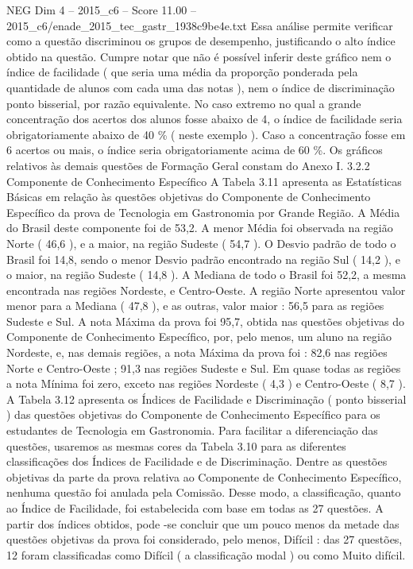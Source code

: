 \begin{textsample}{NEG Dim 4 – 2015\_c6 – Score 11.00 – 2015\_c6/enade\_2015\_tec\_gastr\_1938c9be4e.txt}
Essa análise permite verificar como a questão discriminou os grupos de desempenho, justificando o alto índice obtido na questão.
Cumpre notar que não é possível inferir deste gráfico nem o índice de facilidade ( que seria uma média da proporção ponderada pela quantidade de alunos com cada uma das notas ), nem o índice de discriminação ponto bisserial, por razão equivalente.
No caso extremo no qual a grande concentração dos acertos dos alunos fosse abaixo de 4, o índice de facilidade seria obrigatoriamente abaixo de 40 \% ( neste exemplo ).
Caso a concentração fosse em 6 acertos ou mais, o índice seria obrigatoriamente acima de 60 \%.
Os gráficos relativos às demais questões de Formação Geral constam do Anexo I. 3.2.2 Componente de Conhecimento Específico A Tabela 3.11 apresenta as Estatísticas Básicas em relação às questões objetivas do Componente de Conhecimento Específico da prova de Tecnologia em Gastronomia por Grande Região.
A Média do Brasil deste componente foi de 53,2.
A menor Média foi observada na região Norte ( 46,6 ), e a maior, na região Sudeste ( 54,7 ).
O Desvio padrão de todo o Brasil foi 14,8, sendo o menor Desvio padrão encontrado na região Sul ( 14,2 ), e o maior, na região Sudeste ( 14,8 ).
A Mediana de todo o Brasil foi 52,2, a mesma encontrada nas regiões Nordeste, e Centro-Oeste.
A região Norte apresentou valor menor para a Mediana ( 47,8 ), e as outras, valor maior : 56,5 para as regiões Sudeste e Sul.
A nota Máxima da prova foi 95,7, obtida nas questões objetivas do Componente de Conhecimento Específico, por, pelo menos, um aluno na região Nordeste, e, nas demais regiões, a nota Máxima da prova foi : 82,6 nas regiões Norte e Centro-Oeste ; 91,3 nas regiões Sudeste e Sul.
Em quase todas as regiões a nota Mínima foi zero, exceto nas regiões Nordeste ( 4,3 ) e Centro-Oeste ( 8,7 ).
A Tabela 3.12 apresenta os Índices de Facilidade e Discriminação ( ponto bisserial ) das questões objetivas do Componente de Conhecimento Específico para os estudantes de Tecnologia em Gastronomia.
Para facilitar a diferenciação das questões, usaremos as mesmas cores da Tabela 3.10 para as diferentes classificações dos Índices de Facilidade e de Discriminação.
Dentre as questões objetivas da parte da prova relativa ao Componente de Conhecimento Específico, nenhuma questão foi anulada pela Comissão.
Desse modo, a classificação, quanto ao Índice de Facilidade, foi estabelecida com base em todas as 27 questões.
A partir dos índices obtidos, pode -se concluir que um pouco menos da metade das questões objetivas da prova foi considerado, pelo menos, Difícil : das 27 questões, 12 foram classificadas como Difícil ( a classificação modal ) ou como Muito difícil.

\end{textsample}
